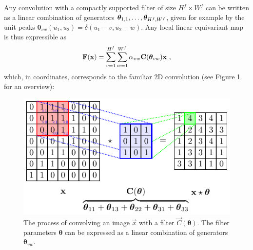 Any convolution with a compactly supported filter of size $H^f \times W^f$
can be written as a linear combination of 
generators $\boldsymbol{\theta}_{1,1}, \dots, \boldsymbol{\theta}_{{H^f,W^f}}$, given for example by the unit peaks $\boldsymbol{\theta}_{vw}(u_1, u_2) = \delta(u_1 - v, u_2 - w)$. Any local linear equivariant map is thus expressible as %
\begin{equation}
    \mathbf{F}(\mathbf{x}) = \sum_{v=1}^{H^f}\sum_{w=1}^{W^f} \alpha_{vw} \mathbf{C}(\boldsymbol{\theta}_{vw})\mathbf{x}~, 
\end{equation}
which, in coordinates, corresponds to the familiar 2D convolution (see Figure \ref{fig:2dconv} for an overview):
\begin{figure}
     \centering
     \includegraphics[width=0.7\linewidth]{figures/2d_conv.pdf}
     \caption{The process of convolving an image $\vec{x}$ with a filter $\vec{C}(\boldsymbol{\theta})$. The filter parameters $\boldsymbol{\theta}$ can be expressed as a linear combination of generators $\boldsymbol{\theta}_{vw}$.}
     \label{fig:2dconv}
\end{figure}
